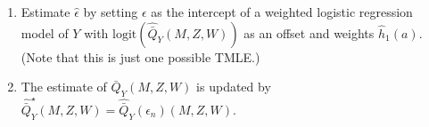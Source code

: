 \documentclass[
  12pt, krantz2,
]{book}
\makeatletter
\newenvironment{Shaded}{\begin{snugshade}}{\end{snugshade}}
\newcommand{\DecValTok}[1]{\textcolor[rgb]{0.00,0.00,0.81}{#1}}
\newcommand{\NormalTok}[1]{#1}
\newcommand{\OperatorTok}[1]{\textcolor[rgb]{0.81,0.36,0.00}{\textbf{#1}}}
\newcommand{\StringTok}[1]{\textcolor[rgb]{0.31,0.60,0.02}{#1}}
\newenvironment{kframe}{%
\medskip{}
\setlength{\fboxsep}{.8em}
 \def\at@end@of@kframe{}%
 \ifinner\ifhmode%
  \def\at@end@of@kframe{\end{minipage}}%
  \begin{minipage}{\columnwidth}%
 \fi\fi%
 \def\FrameCommand##1{\hskip\@totalleftmargin \hskip-\fboxsep
 \colorbox{shadecolor}{##1}\hskip-\fboxsep
     \hskip-\linewidth \hskip-\@totalleftmargin \hskip\columnwidth}%
 \MakeFramed {\advance\hsize-\width
   \@totalleftmargin\z@ \linewidth\hsize
   \@setminipage}}%
 {\par\unskip\endMakeFramed%
 \at@end@of@kframe}
\renewenvironment{Shaded}{\begin{kframe}}{\end{kframe}}
\theoremstyle{definition}
\theoremstyle{definition}
\theoremstyle{definition}
\newcommand{\1}{\mathbbm{1}}
\makeatother
\begin{document}
\begin{Shaded}
\end{Shaded}

\begin{enumerate}
\def\labelenumi{\arabic{enumi}.}
\setcounter{enumi}{5}
\item
  Estimate \(\hat{\epsilon}\) by setting \(\epsilon\) as the intercept of a
  weighted logistic regression model of \(Y\) with
  \(\text{logit}(\hat{\bar{Q}}_{Y}(M,Z,W))\) as an offset and weights
  \(\hat{h}_{1}(a)\). (Note that this is just one possible TMLE.)
\item
  The estimate of \(\bar{Q}_{Y}(M,Z,W)\) is updated by
  \(\hat{\bar{Q}}^{\star}_{Y}(M,Z,W) = \hat{\bar{Q}}_{Y}(\epsilon_n)(M,Z,W)\).
\end{enumerate}
\end{document}
